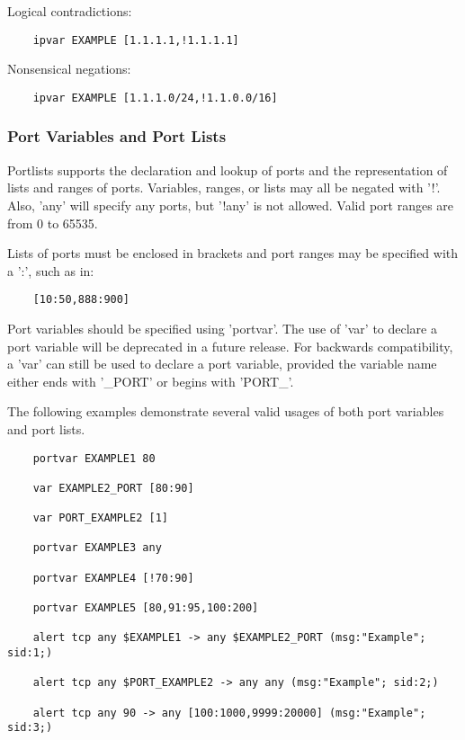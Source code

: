 \documentclass[english]{report}
\begin{document}
Logical contradictions:

\begin{verbatim}
    ipvar EXAMPLE [1.1.1.1,!1.1.1.1]
\end{verbatim}

Nonsensical negations:

\begin{verbatim}
    ipvar EXAMPLE [1.1.1.0/24,!1.1.0.0/16]
\end{verbatim}


\subsubsection{Port Variables and Port Lists}

Portlists supports the declaration and lookup of ports and the representation
of lists and ranges of ports.  Variables, ranges, or lists may all be negated
with '!'.  Also, 'any' will specify any ports, but '!any' is not allowed.  
Valid port ranges are from 0 to 65535.

Lists of ports must be enclosed in brackets and port ranges may be specified 
with a ':', such as in:

\begin{verbatim}     
    [10:50,888:900]
\end{verbatim}

Port variables should be specified using 'portvar'.  The use of 'var' to 
declare a port variable will be deprecated in a future release.  For 
backwards compatibility, a 'var' can still be used to declare a port variable,
provided the variable name either ends with '\_PORT' or begins with 'PORT\_'. 

The following examples demonstrate several valid usages of both port variables
and port lists.

\begin{verbatim}     
    portvar EXAMPLE1 80

    var EXAMPLE2_PORT [80:90]

    var PORT_EXAMPLE2 [1]

    portvar EXAMPLE3 any

    portvar EXAMPLE4 [!70:90]

    portvar EXAMPLE5 [80,91:95,100:200]

    alert tcp any $EXAMPLE1 -> any $EXAMPLE2_PORT (msg:"Example"; sid:1;)

    alert tcp any $PORT_EXAMPLE2 -> any any (msg:"Example"; sid:2;)

    alert tcp any 90 -> any [100:1000,9999:20000] (msg:"Example"; sid:3;)
\end{verbatim}
\end{document}
